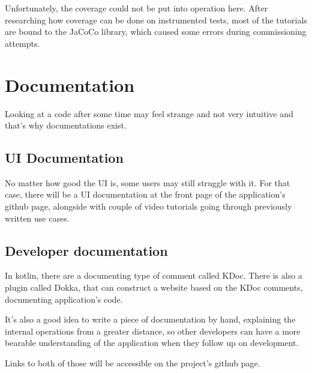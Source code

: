 Unfortunately, the coverage could not be put into operation here.
After researching how coverage can be done on instrumented tests, most of the tutorials are bound to the JaCoCo library, which caused some errors during commissioning attempts.

\section{Documentation}
Looking at a code after some time may feel strange and not very intuitive and that's why documentations exist.

\subsection{UI Documentation}
No matter how good the UI is, some users may still struggle with it.
For that case, there will be a UI documentation at the front page of the application's github page, alongside with couple of video tutorials going through previously written use cases.

\subsection{Developer documentation}
In kotlin, there are a documenting type of comment called KDoc.
There is also a plugin called Dokka, that can construct a website based on the KDoc comments, documenting application's code.

It's also a good idea to write a piece of documentation by hand, explaining the internal operations from a greater distance, so other developers can have a more bearable understanding of the application when they follow up on development.

Links to both of those will be accessible on the project's github page.